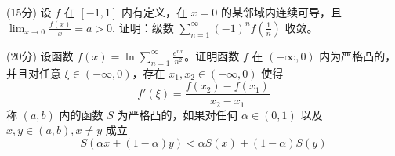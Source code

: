 \documentclass[loose]{ExBook}
\begin{document}
\begin{qitems}
    \begin{bbox}
        \qitem (15分) 设 \( f \) 在 \([-1,1]\) 内有定义，在 \( x = 0 \) 的某邻域内连续可导，且 
        \(
        \lim_{x \to 0} \frac{f(x)}{x} = a > 0.
        \)
        证明：级数 
        \(
        \sum_{n=1}^{\infty}(-1)^n f\left(\frac{1}{n}\right)
        \)
        收敛。
    \end{bbox}
        \begin{bbox}
        \qitem (20分) 设函数 \( f(x) = \ln \sum_{n=1}^{\infty} \frac{e^{nx}}{n^2} \)。证明函数 \( f \) 在 \((-\infty,0)\) 内为严格凸的，并且对任意 \(\xi \in (-\infty,0)\)，存在 \( x_1, x_2 \in (-\infty,0)\) 使得
        \[
        f'(\xi) = \frac{f(x_2) - f(x_1)}{x_2 - x_1}
        \]
        称 \((a,b)\) 内的函数 \( S \) 为严格凸的，如果对任何 \(\alpha \in (0,1)\) 以及 \( x, y \in (a,b), x \neq y \) 成立
        \[
        S(\alpha x + (1 - \alpha)y) < \alpha S(x) + (1 - \alpha)S(y)
        \]
    \end{bbox}
\end{qitems}
\end{document}
